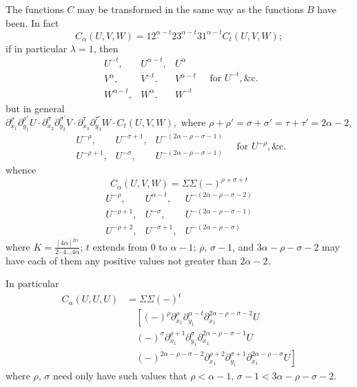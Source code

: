 \documentclass[11pt,a4paper]{article}
\theoremstyle{plain}
\theoremstyle{definition}
\theoremstyle{remark}
\begin{document}
\newpage
The functions $C$ may be transformed in the same way as the functions $B$ have been.
In fact
\[
C_{\alpha}(U, V, W) = 12^{\alpha - t} 23^{\alpha - t} 31^{\alpha - t} C_t(U, V, W);
\]
if in particular $\lambda = 1$, then
\[
\begin{array}{ccc}
U^{-t}, & U^{\alpha - t}, & U^{\alpha} \\
V^{\alpha}, & V^{-t}, & V^{\alpha - t} \\
W^{\alpha - t}, & W^{\alpha}, & W^{-t}
\end{array}
\quad \text{for } U^{-t}, \&\text{c.}
\]
but in general
\[
\partial_{x_1}^{\rho} \partial_{y_1}^{\rho'} U \cdot \partial_{x_2}^{\sigma} \partial_{y_2}^{\sigma'} V \cdot \partial_{x_3}^{\tau} \partial_{y_3}^{\tau'} W \cdot
C_t(U, V, W), \text{ where } \rho + \rho' = \sigma + \sigma' = \tau + \tau' = 2\alpha - 2,
\]
\[
\begin{array}{ccc}
U^{-\rho}, & U^{-\sigma + 1}, & U^{-(2\alpha - \rho - \sigma - 1)} \\
U^{-\rho + 1}, & U^{-\sigma}, & U^{-(2\alpha - \rho - \sigma - 1)}
\end{array}
\quad \text{for } U^{-\rho}, \&\text{c.}
\]
whence
\[
C_{\alpha}(U, V, W) = \Sigma \Sigma (-)^{\rho + \sigma + t}
\]
\[
\begin{array}{ccc}
U^{-\rho}, & U^{\alpha - t}, & U^{-(2\alpha - \rho - \sigma - 2)} \\
U^{-\rho + 1}, & U^{-\sigma}, & U^{-(2\alpha - \rho - \sigma - 1)} \\
U^{-\rho + 2}, & U^{-\sigma + 1}, & U^{-(2\alpha - \rho - \sigma)}
\end{array}
\]
where $K = \frac{[4\alpha]^{2\alpha}}{2 \cdot 4 \ldots 4\alpha}$; $t$ extends from $0$ to $\alpha - 1$; $\rho$, $\sigma - 1$, and $3\alpha - \rho - \sigma - 2$ may have
each of them any positive values not greater than $2\alpha - 2$.

In particular
\begin{align*}
C_{\alpha}(U, U, U) &= \Sigma \Sigma (-)^t \\
&\quad \left[(-)^{\rho} \partial_{x_1}^{\rho} \partial_{y_1}^{\alpha - t} \partial_{x_1}^{2\alpha - \rho - \sigma - 2} U \right. \\
&\quad \left. (-)^{\sigma} \partial_{x_1}^{\rho + 1} \partial_{y_1}^{\sigma} \partial_{x_1}^{2\alpha - \rho - \sigma - 1} U \right. \\
&\quad \left. (-)^{2\alpha - \rho - \sigma - 2} \partial_{x_1}^{\rho + 2} \partial_{y_1}^{\sigma + 1} \partial_{x_1}^{2\alpha - \rho - \sigma} U \right]
\end{align*}
where $\rho$, $\sigma$ need only have such values that $\rho < \alpha - 1$, $\sigma - 1 < 3\alpha - \rho - \sigma - 2$.
\end{document}
